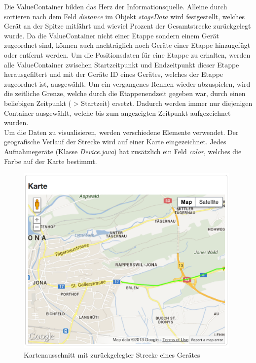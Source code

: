 Die ValueContainer bilden das Herz der Informationsquelle. Alleine durch sortieren nach dem Feld \textit{distance} im Objekt \textit{stageData} wird festgestellt, welches Gerät an der Spitze mitfährt und wieviel Prozent der Gesamtstrecke zurückgelegt wurde. Da die ValueContainer nicht einer Etappe sondern einem Gerät zugeordnet sind, können auch nachträglich noch Geräte einer Etappe hinzugefügt oder entfernt werden. Um die Positionsdaten für eine Etappe zu erhalten, werden alle ValueContainer zwischen Startzeitpunkt und Endzeitpunkt dieser Etappe herausgefiltert und mit der Geräte ID eines Gerätes, welches der Etappe zugeordnet ist, ausgewählt. Um ein vergangenes Rennen wieder abzuspielen, wird die zeitliche Grenze, welche durch die Etappenendzeit gegeben war, durch einen beliebigen Zeitpunkt ( > Startzeit) ersetzt. Dadurch werden immer nur diejenigen Container ausgewählt, welche bis zum angezeigten Zeitpunkt aufgezeichnet wurden.
\\

Um die Daten zu visualisieren, werden verschiedene Elemente verwendet. Der geografische Verlauf der Strecke wird auf einer Karte eingezeichnet. Jedes Aufnahmegeräte (Klasse \textit{Device.java}) hat zusätzlich ein Feld \textit{color}, welches die Farbe auf der Karte bestimmt.
\begin{figure}[H]
	\centering
	\includegraphics[width=110mm]{images/tourliveweb/karte_neu.png}
	\caption{Kartenausschnitt mit zurückgelegter Strecke eines Gerätes}
\end{figure}

